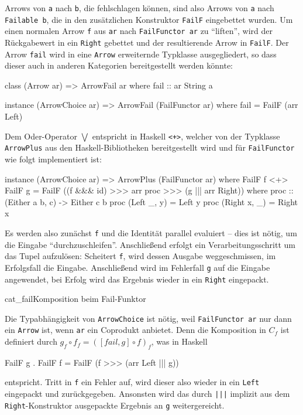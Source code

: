 \documentclass[12pt, a4paper, bibgerm]{scrbook}
\newenvironment{DIFnomarkup}{}{}
\newcommand\icode[1]{\lstinline?#1?}
\newcommand\fig{}
\begin{document}
Arrows von \icode{a} nach \icode{b}, die fehlschlagen können, sind also
Arrows von \icode{a} nach \icode{Failable b}, die in den zusätzlichen
Konstruktor \icode{FailF} eingebettet wurden. Um einen normalen Arrow
\icode{f} aus \icode{ar} nach \icode{FailFunctor ar} zu "`liften"', wird
der Rückgabewert in ein \icode{Right} gebettet und der resultierende
Arrow in \icode{FailF}.
Der Arrow \icode{fail} wird in eine \icode{Arrow} erweiternde Typklasse
ausgegliedert, so dass dieser auch in anderen Kategorien bereitgestellt
werden könnte:

\begin{DIFnomarkup}\begin{code}
class (Arrow ar) => ArrowFail ar where
  fail :: ar String a

instance (ArrowChoice ar) => ArrowFail (FailFunctor ar) where
  fail = FailF (arr Left)
\end{code}\end{DIFnomarkup}

Dem Oder-Operator $\bigvee$ entspricht in Haskell \icode{<+>}, welcher
von der Typklasse \icode{ArrowPlus} aus den Haskell-Bibliotheken
bereitgestellt wird und für \icode{FailFunctor} wie folgt implementiert
ist:

\begin{DIFnomarkup}\begin{code}
instance (ArrowChoice ar) => ArrowPlus (FailFunctor ar) where
  FailF f <+> FailF g = FailF ((f &&& id) >>> arr proc >>> (g ||| arr Right))
   where proc :: (Either a b, c) -> Either c b
         proc (Left  _, y) = Left y
         proc (Right x, _) = Right x
\end{code}\end{DIFnomarkup} %

Es werden also zunächst \icode{f} und die Identität parallel evaluiert --
dies ist nötig, um die Eingabe "`durchzuschleifen"'. Anschließend
erfolgt ein Verarbeitungsschritt um das Tupel aufzulösen: Scheitert
\icode{f}, wird dessen Ausgabe weggeschmissen, im Erfolgsfall die
Eingabe. Anschließend wird im Fehlerfall \icode{g} auf die Eingabe
angewendet, bei Erfolg wird das Ergebnis wieder in ein \icode{Right} eingepackt.

\fig{cat_fail}{Komposition beim Fail-Funktor}

Die Typabhängigkeit von \icode{ArrowChoice} ist nötig, weil
\icode{FailFunctor ar} nur dann ein \icode{Arrow} ist, wenn \icode{ar}
ein Coprodukt anbietet. Denn die Komposition in $C_{f}$ ist definiert
durch $g_{f} \circ f_{f} = ([fail,g] \circ f)_{f}$, was in Haskell
\begin{DIFnomarkup}\begin{code}
FailF g . FailF f = FailF (f >>> (arr Left ||| g))
\end{code}\end{DIFnomarkup} %
entspricht. Tritt in \icode{f} ein Fehler auf, wird dieser also wieder
in ein \icode{Left} eingepackt und zurückgegeben. Ansonsten wird das
durch \icode{|||} implizit aus dem \icode{Right}-Konstruktor ausgepackte
Ergebnis an \icode{g} weitergereicht.
\end{document}
